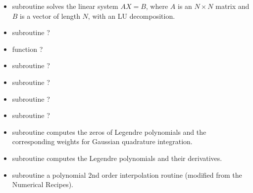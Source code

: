 \documentclass[letterpaper,10pt,english]{sphinxmanual}
\begin{document}
\begin{itemize}
\begin{itemize}
\begin{itemize}
\item {} 
\sphinxAtStartPar
subroutine  \sphinxhyphen{} solves the linear system \(AX = B\), where \(A\) is an \(N \times N\) matrix and \(B\) is a vector of length \(N\), with an LU decomposition.

\item {} 
\sphinxAtStartPar
subroutine  \sphinxhyphen{} ?

\item {} 
\sphinxAtStartPar
function  \sphinxhyphen{} ?

\item {} 
\sphinxAtStartPar
subroutine  \sphinxhyphen{} ?

\item {} 
\sphinxAtStartPar
subroutine  \sphinxhyphen{} ?

\item {} 
\sphinxAtStartPar
subroutine  \sphinxhyphen{} ?

\item {} 
\sphinxAtStartPar
subroutine  \sphinxhyphen{} ?

\item {} 
\sphinxAtStartPar
subroutine  \sphinxhyphen{} computes the zeros of Legendre polynomials and the corresponding
weights for Gaussian quadrature integration.

\item {} 
\sphinxAtStartPar
subroutine  \sphinxhyphen{} computes the Legendre polynomials and their derivatives.

\item {} 
\sphinxAtStartPar
subroutine  \sphinxhyphen{} a polynomial 2nd order interpolation routine (modified from the Numerical Recipes).

\end{itemize}

\end{itemize}

\end{itemize}
\end{document}

